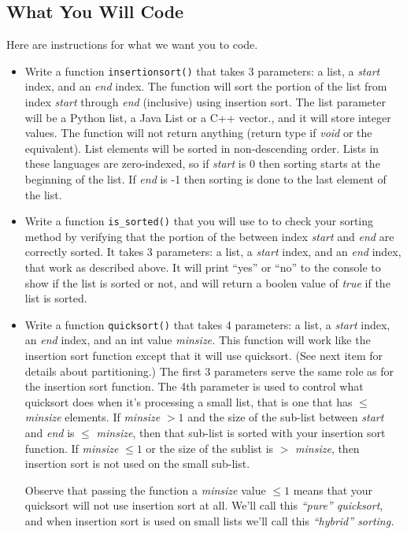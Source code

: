 \documentclass[11pt]{article}
\begin{document}
\subsection*{What You Will Code}
Here are instructions for what we want you to code.
\begin{itemize}

	\item Write a function {\tt insertionsort()} that takes 3 parameters: a list, a {\em start\/} index, and an {\em end\/} index. The function will sort the portion of the list from index {\em start\/} through {\em end\/} (inclusive) using insertion sort.  The list parameter will be a Python list, a Java List or a C++ vector., and it will store integer values. The function will not return anything (return type if {\em void\/} or the equivalent). List elements will be sorted in non-descending order.  Lists in these languages are zero-indexed, so if {\em start\/} is 0 then sorting starts at the beginning of the list.  If {\em end\/} is -1 then sorting is done to the last element of the list.

	\item Write a function {\tt is\_sorted()} that you will use to to check your sorting method by verifying that the portion of the between index {\em start\/} and {\em end\/} are correctly sorted.   It takes 3 parameters: a list, a {\em start\/} index, and an {\em end\/} index, that work as described above.   It will print ``yes'' or ``no'' to the console to show if the list is sorted or not, and will return a boolen value of {\em true\/} if the list is sorted.

	\item Write a function {\tt quicksort()} that takes 4 parameters: a list, a {\em start\/} index, an {\em end\/} index, and an int value {\em minsize.}  This function will work like the insertion sort function except that it will use quicksort. (See next item for details about partitioning.)  The first 3 parameters serve the same role as for the insertion sort function.  The 4th parameter is used to control what quicksort does when it's processing a small list, that is one that has $\leq$ {\em minsize} elements.  If {\em minsize} $> 1$ and the size of the sub-list between {\em start\/} and {\em end\/} is $\leq$ {\em minsize}, then that sub-list is sorted with your insertion sort function.  If {\em minsize} $\leq 1$ or the size of the sublist is $>$ {\em minsize}, then insertion sort is not used on the small sub-list. 
	
	Observe that passing the function a {\em minsize} value $\leq 1$ means that your quicksort will not use insertion sort at all.  We'll call this {\em ``pure'' quicksort\/}, and when insertion sort is used on small lists we'll call this {\em ``hybrid'' sorting.}
	

\end{itemize}
\end{document}

